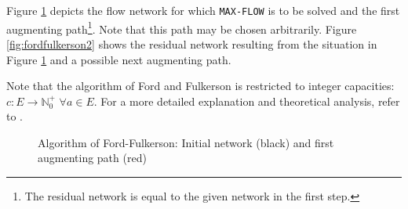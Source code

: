 \documentclass[a4paper,10pt, twocolumn]{article}
\begin{document}
Figure \ref{fig:fordfulkerson1} depicts the flow network for which \lstinline|MAX-FLOW| is to be solved and the first augmenting path\footnote{The residual network is equal to the given network in the first step.}. Note that this path may be chosen arbitrarily. Figure \ref{fig:fordfulkerson2} shows the residual network resulting from the situation in Figure \ref{fig:fordfulkerson1} and a possible next augmenting path. 

Note that the algorithm of Ford and Fulkerson is restricted to integer capacities:  $c:E\rightarrow \mathbb{N}_0^{+}$ $\forall a \in E$. For a more detailed explanation and theoretical analysis, refer to \cite{ahuja93}.

\begin{figure}
\begin{center}
\end{center}
\caption{Algorithm of Ford-Fulkerson: Initial network (black) and first augmenting path (red)}
\label{fig:fordfulkerson1}
\end{figure}
\end{document}
